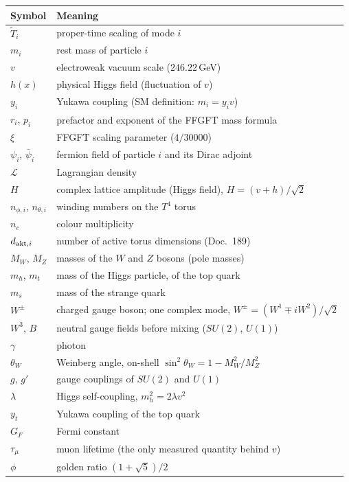 \medskip
\begin{tabular}{@{}lp{9cm}@{}}
\toprule
\textbf{Symbol} & \textbf{Meaning} \\
\midrule
$\tilde T_i$ & proper-time scaling of mode $i$ \\
$m_i$ & rest mass of particle $i$ \\
$v$ & electroweak vacuum scale ($246.22$\,GeV) \\
$h(x)$ & physical Higgs field (fluctuation of $v$) \\
$y_i$ & Yukawa coupling (SM definition: $m_i = y_i v$) \\
$r_i$, $p_i$ & prefactor and exponent of the FFGFT mass formula \\
$\xi$ & FFGFT scaling parameter ($4/30000$) \\
\midrule
$\psi_i$, $\bar\psi_i$ & fermion field of particle $i$ and its Dirac adjoint \\
$\mathcal L$ & Lagrangian density \\
$H$ & complex lattice amplitude (Higgs field), $H = (v+h)/\sqrt2$ \\
$n_{\phi,i}$, $n_{\theta,i}$ & winding numbers on the $T^4$ torus \\
$n_c$ & colour multiplicity \\
$d_{{\rm akt},i}$ & number of active torus dimensions (Doc.~189) \\
\midrule
$M_W$, $M_Z$ & masses of the $W$ and $Z$ bosons (pole masses) \\
$m_h$, $m_t$ & mass of the Higgs particle, of the top quark \\
$m_s$ & mass of the strange quark \\
$W^\pm$ & charged gauge boson; one complex mode, $W^\pm = (W^1\mp iW^2)/\sqrt2$ \\
$W^3$, $B$ & neutral gauge fields before mixing ($SU(2)$, $U(1)$) \\
$\gamma$ & photon \\
$\theta_W$ & Weinberg angle, on-shell $\sin^2\theta_W = 1 - M_W^2/M_Z^2$ \\
$g$, $g'$ & gauge couplings of $SU(2)$ and $U(1)$ \\
$\lambda$ & Higgs self-coupling, $m_h^2 = 2\lambda v^2$ \\
$y_t$ & Yukawa coupling of the top quark \\
$G_F$ & Fermi constant \\
$\tau_\mu$ & muon lifetime (the only measured quantity behind $v$) \\
\midrule
$\phi$ & golden ratio $(1+\sqrt5)/2$ \\

\end{tabular}

